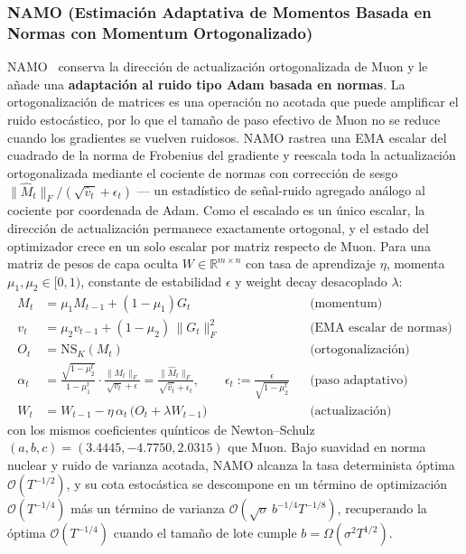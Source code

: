 \subsubsection{NAMO (Estimación Adaptativa de Momentos Basada en Normas con Momentum Ortogonalizado)}
NAMO~\citep{zhang_namo_2026} conserva la dirección de actualización ortogonalizada de
Muon y le añade una \textbf{adaptación al ruido tipo Adam basada en normas}. La
ortogonalización de matrices es una operación no acotada que puede amplificar el ruido
estocástico, por lo que el tamaño de paso efectivo de Muon no se reduce cuando los
gradientes se vuelven ruidosos. NAMO rastrea una EMA escalar del cuadrado de la norma de
Frobenius del gradiente y reescala toda la actualización ortogonalizada mediante el
cociente de normas con corrección de sesgo
$\lVert\widehat M_t\rVert_F/(\sqrt{\widehat v_t}+\epsilon_t)$ --- un estadístico de
señal-ruido agregado análogo al cociente por coordenada de Adam. Como el escalado es un
único escalar, la dirección de actualización permanece exactamente ortogonal, y el
estado del optimizador crece en un solo escalar por matriz respecto de Muon. Para una
matriz de pesos de capa oculta $W \in \mathbb{R}^{m\times n}$ con tasa de aprendizaje
$\eta$, momenta $\mu_1,\mu_2 \in [0,1)$, constante de estabilidad $\epsilon$ y weight
decay desacoplado $\lambda$:
\begin{align}
M_t &= \mu_1 M_{t-1} + (1-\mu_1) G_t && \text{(momentum)} \\
v_t &= \mu_2 v_{t-1} + (1-\mu_2)\,\lVert G_t\rVert_F^2 && \text{(EMA escalar de normas)} \\
O_t &= \mathrm{NS}_K(M_t) && \text{(ortogonalización)} \\
\alpha_t &= \frac{\sqrt{1-\mu_2^t}}{1-\mu_1^t}\cdot\frac{\lVert M_t\rVert_F}{\sqrt{v_t}+\epsilon}
   = \frac{\lVert\widehat M_t\rVert_F}{\sqrt{\widehat v_t}+\epsilon_t},
   \qquad \epsilon_t := \frac{\epsilon}{\sqrt{1-\mu_2^t}} && \text{(paso adaptativo)} \\
W_t &= W_{t-1} - \eta\,\alpha_t\,\bigl(O_t + \lambda W_{t-1}\bigr) && \text{(actualización)}
\end{align}
con los mismos coeficientes quínticos de Newton--Schulz $(a,b,c)=(3.4445,-4.7750,2.0315)$
que Muon. Bajo suavidad en norma nuclear y ruido de varianza acotada, NAMO alcanza la
tasa determinista óptima $\mathcal{O}(T^{-1/2})$, y su cota estocástica se descompone en
un término de optimización $\mathcal{O}(T^{-1/4})$ más un término de varianza
$\mathcal{O}(\sqrt{\sigma}\,b^{-1/4}T^{-1/8})$, recuperando la óptima $\mathcal{O}(T^{-1/4})$
cuando el tamaño de lote cumple $b=\Omega(\sigma^2 T^{1/2})$.


